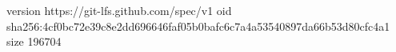 version https://git-lfs.github.com/spec/v1
oid sha256:4cf0bc72e39c8e2dd696646faf05b0bafc6c7a4a53540897da66b53d80cfc4a1
size 196704
